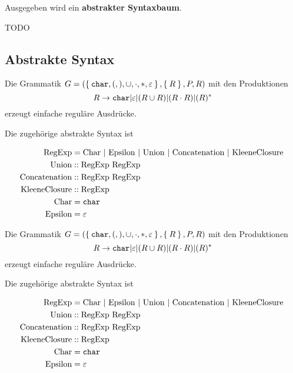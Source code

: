 Ausgegeben wird ein \textbf{abstrakter Syntaxbaum}.

\begin{beispiel}
	TODO
\end{beispiel}

\subsection{Abstrakte Syntax}%
\begin{beispiel}
    Die Grammatik $G = (\Set{\text{\texttt{char}}, (, ), \cup, \cdot, *, \varepsilon}, \Set{R}, P, R)$ mit den Produktionen
    \[R \rightarrow \text{\texttt{char}} | \varepsilon | ( R \cup R ) | (R \cdot R) | (R)^*\]
    erzeugt einfache reguläre Ausdrücke.

    Die zugehörige abstrakte Syntax ist

    \begin{align*}
        \text{RegExp} &= \text{Char } | \text{ Epsilon } | \text{ Union } | \text{ Concatenation } | \text{ KleeneClosure }\\
        \text{Union} &:: \text{RegExp RegExp}\\
        \text{Concatenation} &:: \text{RegExp RegExp}\\
        \text{KleeneClosure} &:: \text{RegExp}\\
        \text{Char} &= \text{\texttt{char}}\\
        \text{Epsilon} &= \varepsilon\\
    \end{align*}
\end{beispiel}

\begin{beispiel}
    Die Grammatik $G = (\Set{\text{\texttt{char}}, (, ), \cup, \cdot, *, \varepsilon}, \Set{R}, P, R)$ mit den Produktionen
    \[R \rightarrow \text{\texttt{char}} | \varepsilon | ( R \cup R ) | (R \cdot R) | (R)^*\]
    erzeugt einfache reguläre Ausdrücke.

    Die zugehörige abstrakte Syntax ist

    \begin{align*}
        \text{RegExp} &= \text{Char } | \text{ Epsilon } | \text{ Union } | \text{ Concatenation } | \text{ KleeneClosure }\\
        \text{Union} &:: \text{RegExp RegExp}\\
        \text{Concatenation} &:: \text{RegExp RegExp}\\
        \text{KleeneClosure} &:: \text{RegExp}\\
        \text{Char} &= \text{\texttt{char}}\\
        \text{Epsilon} &= \varepsilon\\
    \end{align*}
\end{beispiel}

